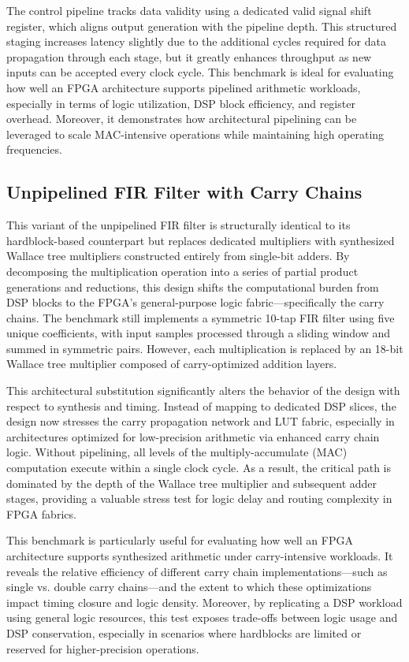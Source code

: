 The control pipeline tracks data validity using a dedicated valid signal shift register, which aligns output generation with the pipeline depth. This structured staging increases latency slightly due to the additional cycles required for data propagation through each stage, but it greatly enhances throughput as new inputs can be accepted every clock cycle. This benchmark is ideal for evaluating how well an FPGA architecture supports pipelined arithmetic workloads, especially in terms of logic utilization, DSP block efficiency, and register overhead. Moreover, it demonstrates how architectural pipelining can be leveraged to scale MAC-intensive operations while maintaining high operating frequencies.

\subsection{Unpipelined FIR Filter with Carry Chains}
This variant of the unpipelined FIR filter is structurally identical to its hardblock-based counterpart but replaces dedicated multipliers with synthesized Wallace tree multipliers constructed entirely from single-bit adders. By decomposing the multiplication operation into a series of partial product generations and reductions, this design shifts the computational burden from DSP blocks to the FPGA's general-purpose logic fabric—specifically the carry chains. The benchmark still implements a symmetric 10-tap FIR filter using five unique coefficients, with input samples processed through a sliding window and summed in symmetric pairs. However, each multiplication is replaced by an 18-bit Wallace tree multiplier composed of carry-optimized addition layers.

This architectural substitution significantly alters the behavior of the design with respect to synthesis and timing. Instead of mapping to dedicated DSP slices, the design now stresses the carry propagation network and LUT fabric, especially in architectures optimized for low-precision arithmetic via enhanced carry chain logic. Without pipelining, all levels of the multiply-accumulate (MAC) computation execute within a single clock cycle. As a result, the critical path is dominated by the depth of the Wallace tree multiplier and subsequent adder stages, providing a valuable stress test for logic delay and routing complexity in FPGA fabrics.

This benchmark is particularly useful for evaluating how well an FPGA architecture supports synthesized arithmetic under carry-intensive workloads. It reveals the relative efficiency of different carry chain implementations—such as single vs. double carry chains—and the extent to which these optimizations impact timing closure and logic density. Moreover, by replicating a DSP workload using general logic resources, this test exposes trade-offs between logic usage and DSP conservation, especially in scenarios where hardblocks are limited or reserved for higher-precision operations.

